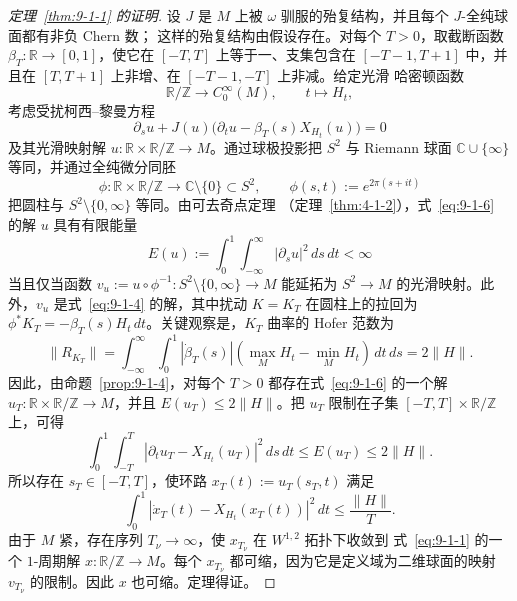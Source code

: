 \begin{proof}[定理~\ref{thm:9-1-1} 的证明]
设 $J$ 是 $M$ 上被 $\omega$ 驯服的殆复结构，并且每个 $J$-全纯球面都有非负 Chern 数；
这样的殆复结构由假设存在。对每个 $T>0$，取截断函数
$\beta_T:\mathbb R\to[0,1]$，使它在 $[-T,T]$ 上等于一、支集包含在
$[-T-1,T+1]$ 中，并且在 $[T,T+1]$ 上非增、在 $[-T-1,-T]$ 上非减。给定光滑
哈密顿函数
\[
  \mathbb R/\mathbb Z\longrightarrow C_0^\infty(M),\qquad t\longmapsto H_t,
\]
考虑受扰柯西--黎曼方程
\begin{equation}\label{eq:9-1-6}
  \partial_su+J(u)\bigl(\partial_tu-\beta_T(s)X_{H_t}(u)\bigr)=0
\end{equation}
及其光滑映射解 $u:\mathbb R\times\mathbb R/\mathbb Z\to M$。通过球极投影把
$S^2$ 与 Riemann 球面 $\mathbb C\cup\{\infty\}$ 等同，并通过全纯微分同胚
\[
  \phi:\mathbb R\times\mathbb R/\mathbb Z\longrightarrow
  \mathbb C\setminus\{0\}\subset S^2,
  \qquad \phi(s,t):=e^{2\pi(s+it)}
\]
把圆柱与 $S^2\setminus\{0,\infty\}$ 等同。由可去奇点定理
（定理~\ref{thm:4-1-2}），式~\eqref{eq:9-1-6} 的解 $u$ 具有有限能量
\[
  E(u):=\int_0^1\int_{-\infty}^{\infty}|\partial_su|^2\,ds\,dt<\infty
\]
当且仅当函数 $v_u:=u\circ\phi^{-1}:S^2\setminus\{0,\infty\}\to M$ 能延拓为
$S^2\to M$ 的光滑映射。此外，$v_u$ 是式~\eqref{eq:9-1-4} 的解，其中扰动
$K=K_T$ 在圆柱上的拉回为
$\phi^*K_T=-\beta_T(s)H_t\,dt$。关键观察是，$K_T$ 曲率的 Hofer 范数为
\[
  \|R_{K_T}\|
  =\int_{-\infty}^{\infty}\int_0^1|\dot\beta_T(s)|
    \left(\max_MH_t-\min_MH_t\right)\,dt\,ds
  =2\|H\|.
\]
因此，由命题~\ref{prop:9-1-4}，对每个 $T>0$ 都存在式~\eqref{eq:9-1-6}
的一个解 $u_T:\mathbb R\times\mathbb R/\mathbb Z\to M$，并且
$E(u_T)\le2\|H\|$。把 $u_T$ 限制在子集
$[-T,T]\times\mathbb R/\mathbb Z$ 上，可得
\[
  \int_0^1\int_{-T}^{T}
  |\partial_tu_T-X_{H_t}(u_T)|^2\,ds\,dt
  \le E(u_T)\le2\|H\|.
\]
所以存在 $s_T\in[-T,T]$，使环路 $x_T(t):=u_T(s_T,t)$ 满足
\[
  \int_0^1|\dot x_T(t)-X_{H_t}(x_T(t))|^2\,dt\le\frac{\|H\|}{T}.
\]
由于 $M$ 紧，存在序列 $T_\nu\to\infty$，使 $x_{T_\nu}$ 在 $W^{1,2}$ 拓扑下收敛到
式~\eqref{eq:9-1-1} 的一个 $1$-周期解
$x:\mathbb R/\mathbb Z\to M$。每个 $x_{T_\nu}$ 都可缩，因为它是定义域为二维球面的映射
$v_{T_\nu}$ 的限制。因此 $x$ 也可缩。定理得证。
\end{proof}

